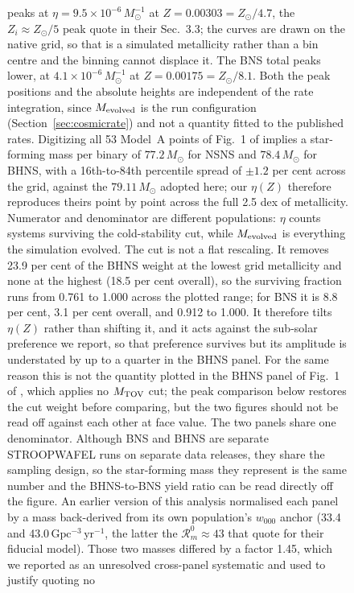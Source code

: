 \documentclass[twocolumn,apj]{openjournal}
\newcommand{\Msun}{M_\odot}
\begin{document}
\begin{figure}[!tbp]
{peaks at $\eta=9.5\times10^{-6}\,M_\odot^{-1}$ at $Z=0.00303=Z_\odot/4.7$,
the $Z_i\approx Z_\odot/5$ peak \citet{broekgaarden2021} quote in their
Sec.~3.3; the curves are drawn on the native grid, so that is a simulated
metallicity rather than a bin centre and the binning cannot displace it. The
BNS total peaks lower, at $4.1\times10^{-6}\,M_\odot^{-1}$ at
$Z=0.00175=Z_\odot/8.1$. Both the peak positions and the absolute heights are
independent of the rate integration, since $M_{\rm evolved}$ is the run
configuration (Section~\ref{sec:cosmicrate}) and not a quantity fitted to the
published rates. Digitizing all 53 Model~A points of Fig.~1 of
\citet{broekgaarden2022} implies a star-forming mass per binary of
$77.2\,\Msun$ for NSNS and $78.4\,\Msun$ for BHNS, with a 16th-to-84th
percentile spread of $\pm 1.2$ per cent across the grid, against the
$79.11\,\Msun$ adopted here; our $\eta(Z)$ therefore reproduces theirs point by
point across the full 2.5 dex of metallicity. Numerator and denominator are
different populations:
$\eta$ counts systems surviving the cold-stability cut, while
$M_{\rm evolved}$ is everything the simulation evolved. The cut is not a flat
rescaling. It removes
23.9 per cent of the BHNS weight at the lowest grid metallicity and none at
the highest (18.5 per cent overall), so the surviving fraction runs from
0.761 to 1.000 across the plotted range; for BNS it is 8.8 per cent, 3.1 per
cent overall, and 0.912 to 1.000. It therefore tilts $\eta(Z)$ rather than
shifting it, and it acts against the sub-solar preference we report, so that
preference survives but its amplitude is understated by up to a quarter in
the BHNS panel. For the same reason this is not the quantity plotted in the
BHNS panel of Fig.~1 of \citet{broekgaarden2022}, which applies no
$M_{\rm TOV}$ cut; the peak comparison below restores the cut weight before
comparing, but the two figures should not be read off against each other at
face value. The two panels share one denominator. Although BNS and BHNS are
separate STROOPWAFEL runs on separate data releases, they share the sampling
design, so the star-forming mass they represent is the same number and the
BHNS-to-BNS yield ratio can be read directly off the figure. An earlier version
of this analysis normalised each panel by a mass back-derived from its own
population's $w_{000}$ anchor (33.4 and 43.0\,$\mathrm{Gpc^{-3}\,yr^{-1}}$, the
latter the $\mathcal{R}_m^0\approx43$ that \citet{broekgaarden2021} quote for
their fiducial model). Those two masses differed by a factor 1.45, which we
reported as an unresolved cross-panel systematic and used to justify quoting no
}
\end{figure}
\end{document}
